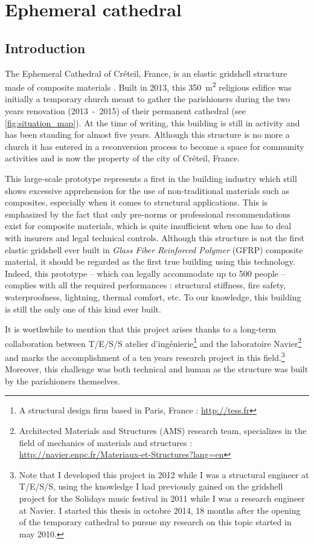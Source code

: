 
\newrefsegment
\chapter{Ephemeral cathedral}\label{chp=creteil}

\section{Introduction}

The Ephemeral Cathedral of Créteil, France, is an elastic gridshell structure made of composite materials \cite{DuPeloux2016}. Built in 2013, this \SI{350}{m^2} religious edifice was initially a temporary church meant to gather the parishioners during the two years renovation (2013~-~2015) of their permanent cathedral (see \cref{fig:situation_map}). At the time of writing, this building is still in activity and has been standing for almost five years. Although this structure is no more a church it has entered in a reconversion process to become a space for community activities and is now the property of the city of Créteil, France.

This large-scale prototype represents a first in the building industry which still shows excessive apprehension for the use of non-traditional materials such as composites, especially when it comes to structural applications. This is emphasized by the fact that only pre-norms or professional recommendations exist for composite materials, which is quite insufficient when one has to deal with insurers and legal technical controls.
Although this structure is not the first elastic gridshell ever built in \emph{Glass Fiber Reinforced Polymer} (GFRP) composite material, it should be regarded as the first true building using this technology. Indeed, this prototype -- which can legally accommodate up to 500 people -- complies with all the required performances : structural stiffness, fire safety, waterproofness, lightning, thermal comfort, etc. To our knowledge, this building is still the only one of this kind ever built.

It is worthwhile to mention that this project arises thanks to a long-term collaboration between {T/E/S/S atelier d'ingénierie}\footnote{A structural design firm based in Paris, France : \url{http://tess.fr}} and the laboratoire Navier\footnote{Architected Materials and Structures (AMS) research team, specializes in the field of mechanics of materials and structures : \url{http://navier.enpc.fr/Materiaux-et-Structures?lang=en}} and marks the accomplishment of a ten years research project in this field.\footnote{Note that I developed this project in 2012 while I was a structural engineer at T/E/S/S, using the knowledge I had previously gained on the gridshell project for the Solidays music festival in 2011 while I was a research engineer at Navier. I started this thesis in octobre 2014, 18 months after the opening of the temporary cathedral to pursue my research on this topic started in may 2010.} Moreover, this challenge was both technical and human as the structure was built by the parishioners themselves.

